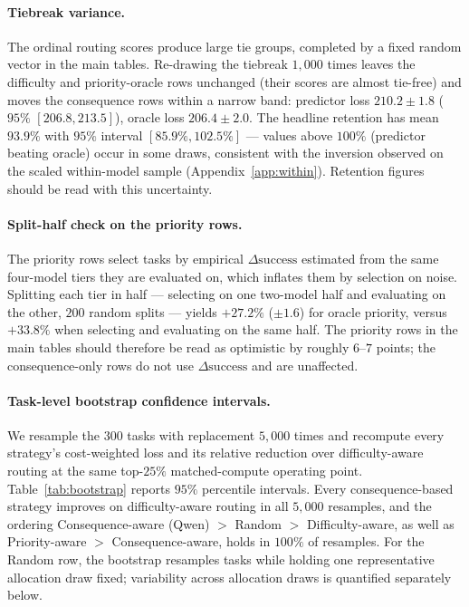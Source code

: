 \documentclass{article}
\begin{document}
\paragraph{Tiebreak variance.} The ordinal routing scores produce
large tie groups, completed by a fixed random vector in the main
tables. Re-drawing the tiebreak $1{,}000$ times leaves the
difficulty and priority-oracle rows unchanged (their scores are
almost tie-free) and moves the consequence rows within a narrow
band: predictor loss $210.2 \pm 1.8$ ($95\%$ $[206.8, 213.5]$),
oracle loss $206.4 \pm 2.0$. The headline retention has mean
$93.9\%$ with $95\%$ interval $[85.9\%, 102.5\%]$ --- values above
$100\%$ (predictor beating oracle) occur in some draws, consistent
with the inversion observed on the scaled within-model sample
(Appendix~\ref{app:within}). Retention figures should be read with
this uncertainty.

\paragraph{Split-half check on the priority rows.} The priority
rows select tasks by empirical $\Delta\mathrm{success}$ estimated
from the same four-model tiers they are evaluated on, which inflates
them by selection on noise. Splitting each tier in half ---
selecting on one two-model half and evaluating on the other, $200$
random splits --- yields $+27.2\%$ ($\pm 1.6$) for oracle priority,
versus $+33.8\%$ when selecting and evaluating on the same half.
The priority rows in the main tables should therefore be read as
optimistic by roughly $6$--$7$ points; the consequence-only rows do
not use $\Delta\mathrm{success}$ and are unaffected.

\paragraph{Task-level bootstrap confidence intervals.} We resample the
$300$ tasks with replacement $5{,}000$ times and recompute every
strategy's cost-weighted loss and its relative reduction over
difficulty-aware routing at the same top-$25\%$ matched-compute
operating point. Table~\ref{tab:bootstrap} reports $95\%$ percentile
intervals. Every consequence-based strategy improves on
difficulty-aware routing in all $5{,}000$ resamples, and the ordering
Consequence-aware (Qwen) $>$ Random $>$ Difficulty-aware, as well as
Priority-aware $>$ Consequence-aware, holds in $100\%$ of resamples.
For the Random row, the bootstrap resamples tasks while holding one
representative allocation draw fixed; variability across allocation
draws is quantified separately below.
\end{document}

